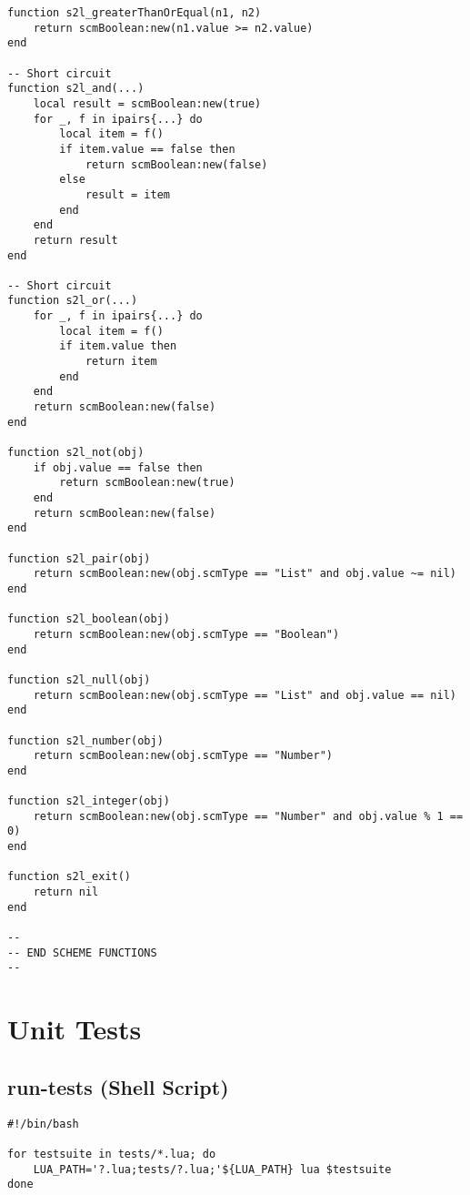 \begin{verbatim}
function s2l_greaterThanOrEqual(n1, n2)
    return scmBoolean:new(n1.value >= n2.value)
end

-- Short circuit
function s2l_and(...)
    local result = scmBoolean:new(true)
    for _, f in ipairs{...} do
        local item = f()
        if item.value == false then
            return scmBoolean:new(false)
        else
            result = item
        end
    end
    return result
end

-- Short circuit
function s2l_or(...)
    for _, f in ipairs{...} do
        local item = f()
        if item.value then
            return item
        end
    end
    return scmBoolean:new(false)
end

function s2l_not(obj)
    if obj.value == false then
        return scmBoolean:new(true)
    end
    return scmBoolean:new(false)
end

function s2l_pair(obj)
    return scmBoolean:new(obj.scmType == "List" and obj.value ~= nil)
end

function s2l_boolean(obj)
    return scmBoolean:new(obj.scmType == "Boolean")
end

function s2l_null(obj)
    return scmBoolean:new(obj.scmType == "List" and obj.value == nil)
end

function s2l_number(obj)
    return scmBoolean:new(obj.scmType == "Number")
end

function s2l_integer(obj)
    return scmBoolean:new(obj.scmType == "Number" and obj.value % 1 == 0)
end

function s2l_exit()
    return nil
end

--
-- END SCHEME FUNCTIONS
--
\end{verbatim}


\section{Unit Tests}
\subsection{run-tests (Shell Script)}
\begin{verbatim}
#!/bin/bash

for testsuite in tests/*.lua; do
    LUA_PATH='?.lua;tests/?.lua;'${LUA_PATH} lua $testsuite
done
\end{verbatim}

